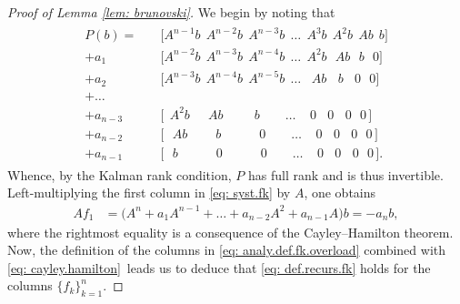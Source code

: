 \documentclass[11pt, a4paper, reqno]{amsart}
\theoremstyle{plain}
\numberwithin{equation}{section}
\begin{document}
\begin{proof}[Proof of Lemma \ref{lem: brunovski}]
We begin by noting that
\begin{align}\label{eq: syst.fk}
\begin{aligned}
P(b)
= \quad &\Big[A^{n-1} b  \ \ A^{n-2}b \ \ A^{n-3}b \ \ \ldots  \ \ A^3b \ \  A^2b \ \ Ab \ \ b\Big]\\
+ a_1 &\Big[ A^{n-2}b \ \  A^{n-3}b \ \ A^{n-4}b \ \ \ldots \ \ A^2b  \ \ \ Ab \ \ \ b \ \ \ 0\Big]\\
+ a_2 &\Big[ A^{n-3}b \ \ A^{n-4}b \ \ A^{n-5}b \ \  \ldots \ \ \ \, Ab  \ \ \ \ b \ \ \ \ 0  \ \ \  0  \Big] \\
+ \ldots &\\
 + a_{n-3} &\Big[ \ \ A^2b  \quad \ \ Ab \qquad \ \ b \qquad \ldots \ \ \ \ \ 0  \ \ \ \  0 \ \ \ \ 0 \ \ \ 0 \, \Big]\\
 + a_{n-2} &\Big[ \ \ \ Ab  \qquad \ b \qquad \quad 0 \qquad \ldots \ \ \ \ \ 0  \ \ \ \  0 \ \ \ \ 0 \ \ \ 0 \, \Big]\\
 + a_{n-1} &\Big[ \ \ \ b  \qquad \quad 0  \qquad \quad 0 \qquad \ldots \ \ \ \ \ 0  \ \ \ \  0 \ \ \ \ 0 \ \ \ 0 \, \Big].
\end{aligned}
\end{align}
Whence, by the Kalman rank condition, $P$ has full rank and is thus invertible.
Left-multiplying the first column in \eqref{eq: syst.fk} by $A$, one obtains
\begin{align} \label{eq: cayley.hamilton}
Af_1 &= \big(A^n +a_1A^{n-1} + \ldots + a_{n-2}A^2 + a_{n-1}A\big)b = -a_n b,
\end{align}
where the rightmost equality is a consequence of the Cayley–Hamilton theorem.
Now, the definition of the columns in \eqref{eq: analy.def.fk.overload} combined with \eqref{eq: cayley.hamilton} leads us to deduce that \eqref{eq: def.recurs.fk} holds for the columns $\{f_k\}_{k=1}^n$.

\end{proof}
\end{document}
